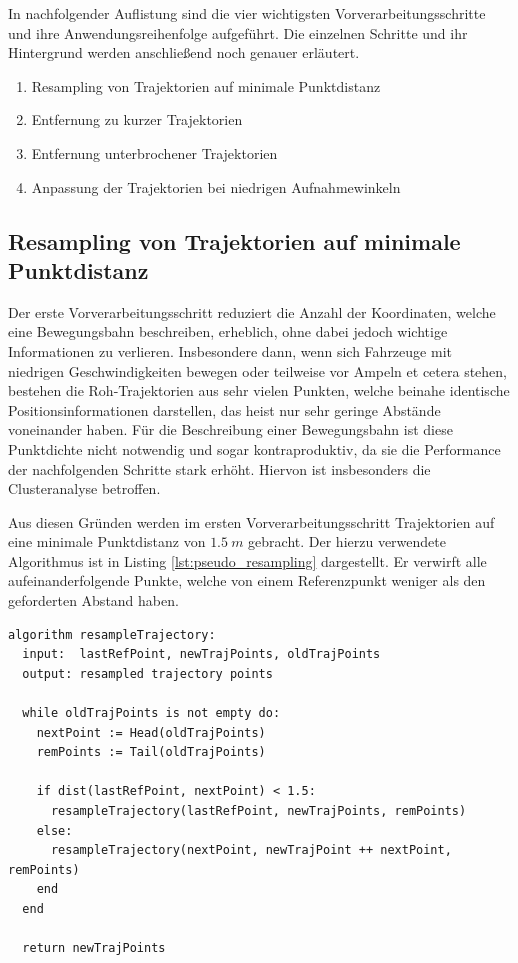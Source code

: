 In nachfolgender Auflistung sind die vier wichtigsten Vorverarbeitungsschritte und ihre Anwendungsreihenfolge
aufgeführt. Die einzelnen Schritte und ihr Hintergrund werden anschließend noch genauer erläutert.

\begin{enumerate}
    \item Resampling von Trajektorien auf minimale Punktdistanz
    \item Entfernung zu kurzer Trajektorien
    \item Entfernung unterbrochener Trajektorien
    \item Anpassung der Trajektorien bei niedrigen Aufnahmewinkeln
\end{enumerate}

\subsection{Resampling von Trajektorien auf minimale Punktdistanz}
Der erste Vorverarbeitungsschritt reduziert die Anzahl der Koordinaten, welche eine Bewegungsbahn beschreiben, erheblich,
ohne dabei jedoch wichtige Informationen zu verlieren. Insbesondere dann, wenn sich Fahrzeuge mit niedrigen
Geschwindigkeiten bewegen oder teilweise vor Ampeln et cetera stehen, bestehen die Roh-Trajektorien aus sehr vielen
Punkten, welche beinahe identische Positionsinformationen darstellen, das heist nur sehr geringe
Abstände voneinander haben. Für die Beschreibung einer Bewegungsbahn ist diese Punktdichte nicht notwendig
und sogar kontraproduktiv, da sie die Performance der nachfolgenden Schritte stark erhöht. Hiervon ist insbesonders
die Clusteranalyse betroffen.

Aus diesen Gründen werden im ersten Vorverarbeitungsschritt Trajektorien auf eine minimale Punktdistanz
von $1.5\ m$ gebracht. Der hierzu verwendete Algorithmus ist in Listing \ref{lst:pseudo_resampling} dargestellt.
Er verwirft alle aufeinanderfolgende Punkte, welche von einem Referenzpunkt weniger als den geforderten Abstand haben.
\begin{lstlisting}[caption=Pseudocode Trajektorie Resampling, language=Pseudo, label=lst:pseudo_resampling]
algorithm resampleTrajectory:
  input:  lastRefPoint, newTrajPoints, oldTrajPoints
  output: resampled trajectory points

  while oldTrajPoints is not empty do:
    nextPoint := Head(oldTrajPoints)
    remPoints := Tail(oldTrajPoints)

    if dist(lastRefPoint, nextPoint) < 1.5:
      resampleTrajectory(lastRefPoint, newTrajPoints, remPoints)
    else:
      resampleTrajectory(nextPoint, newTrajPoint ++ nextPoint, remPoints)
    end
  end

  return newTrajPoints
\end{lstlisting}

